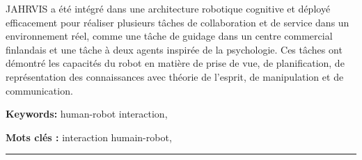 \documentclass[english,a4paper,11pt,twoside]{StyleThese}
\begin{document}
\begin{vcenterpage}
JAHRVIS a été intégré dans une architecture robotique cognitive et déployé efficacement pour réaliser plusieurs tâches de collaboration et de service dans un environnement réel, comme une tâche de guidage dans un centre commercial finlandais et une tâche à deux agents inspirée de la psychologie. Ces tâches ont démontré les capacités du robot en matière de prise de vue, de planification, de représentation des connaissances avec théorie de l'esprit, de manipulation et de communication.




\textbf{Keywords:} human-robot interaction,

\textbf{Mots clés :} interaction humain-robot,
\\
\noindent\rule[2pt]{\textwidth}{0.5pt}
\end{vcenterpage}
\end{document}
